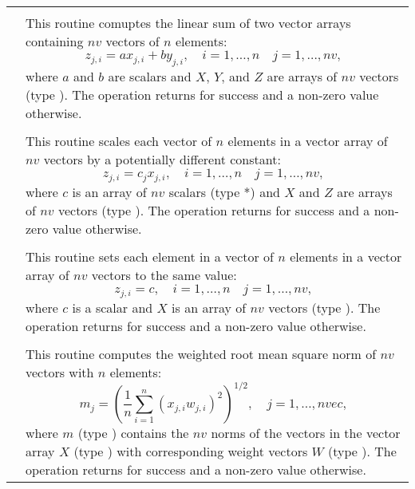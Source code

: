 \begin{xtabular}{|p{\colonec}|p{\coltwoc}|}

 &  \\
& This routine comuptes the linear sum of two vector arrays containing $nv$
vectors of $n$ elements:
\begin{equation*}
z_{j,i} = a x_{j,i} + b y_{j,i}, \quad i=1,\ldots,n \quad j=1,\ldots,nv,
\end{equation*}
where $a$ and $b$ are  scalars and $X$, $Y$, and $Z$ are arrays of
$nv$ vectors (type ). The operation returns  for success and
a non-zero value otherwise.
\\[2mm]

 &  \\
& This routine scales each vector of $n$ elements in a vector array of $nv$
vectors by a potentially different constant:
\begin{equation*}
z_{j,i} = c_j x_{j,i}, \quad i=1,\ldots,n \quad j=1,\ldots,nv,
\end{equation*}
where $c$ is an array of $nv$ scalars (type *) and $X$ and $Z$ are
arrays of $nv$ vectors (type ). The operation returns  for
success and a non-zero value otherwise.
\\[2mm]

 &  \\
& This routine sets each element in a vector of $n$ elements in a vector array of
$nv$ vectors to the same value:
\begin{equation*}
z_{j,i} = c, \quad i=1,\ldots,n \quad j=1,\ldots,nv,
\end{equation*}
where $c$ is a  scalar and $X$ is an array of $nv$ vectors (type
). The operation returns  for success and a non-zero value
otherwise.
\\[2mm]

 &  \\
& This routine computes the weighted root mean square norm of $nv$ vectors with
$n$ elements:
\begin{equation*}
m_j = \left( \frac1n \sum_{i=1}^{n} \left(x_{j,i} w_{j,i}\right)^2\right)^{1/2}, \quad j=1,\ldots,nvec,
\end{equation*}
where $m$ (type ) contains the $nv$ norms of the vectors in the
vector array $X$ (type ) with corresponding weight vectors $W$
(type ). The operation returns  for success and a non-zero
value otherwise.
\\[2mm]


\end{xtabular}
